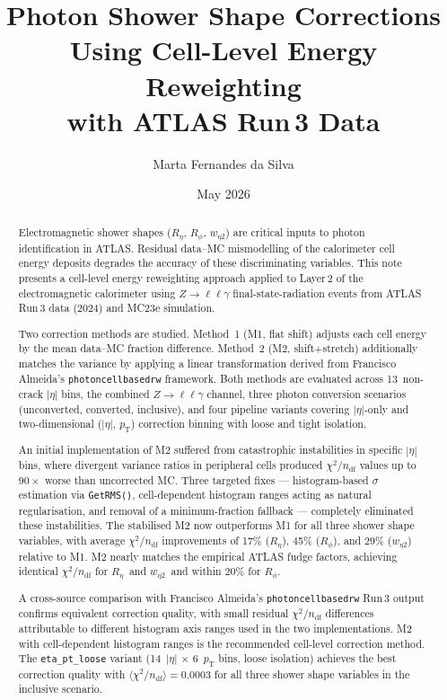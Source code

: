 \documentclass[11pt,a4paper]{article}
\title{Photon Shower Shape Corrections Using Cell-Level Energy Reweighting\\
       with ATLAS Run\,3 Data}
\author{Marta Fernandes da Silva}
\date{May 2026}
\newcommand{\Reta}{\ensuremath{R_{\eta}}}
\newcommand{\Rphi}{\ensuremath{R_{\phi}}}
\newcommand{\weta}{\ensuremath{w_{\eta 2}}}
\newcommand{\abseta}{\ensuremath{|\eta|}}
\newcommand{\chisq}{\ensuremath{\chi^2 / n_{\mathrm{df}}}}
\newcommand{\pt}{\ensuremath{p_{\mathrm{T}}}}
\begin{document}
\maketitle

\begin{abstract}
Electromagnetic shower shapes (\Reta, \Rphi, \weta) are critical inputs to
photon identification in ATLAS.  Residual data--MC mismodelling of the
calorimeter cell energy deposits degrades the accuracy of these
discriminating variables.  This note presents a cell-level energy
reweighting approach applied to Layer\,2 of the electromagnetic
calorimeter using $Z \to \ell\ell\gamma$ final-state-radiation events from
ATLAS Run\,3 data (2024) and MC23e simulation.

Two correction methods are studied.  Method~1 (M1, flat shift) adjusts
each cell energy by the mean data--MC fraction difference.  Method~2
(M2, shift+stretch) additionally matches the variance by applying a
linear transformation derived from Francisco Almeida's
\texttt{photoncellbasedrw} framework.  Both methods are evaluated across
13~non-crack $\abseta$ bins, the combined $Z \to \ell\ell\gamma$ channel,
three photon conversion scenarios (unconverted, converted, inclusive),
and four pipeline variants covering $\abseta$-only and two-dimensional
($\abseta$, $\pt$) correction binning with loose and tight isolation.

An initial implementation of M2 suffered from catastrophic instabilities
in specific $\abseta$ bins, where divergent variance ratios in peripheral
cells produced $\chisq$ values up to $90\times$ worse than uncorrected MC.
Three targeted fixes --- histogram-based $\sigma$ estimation via
\texttt{GetRMS()}, cell-dependent histogram ranges acting as natural
regularisation, and removal of a minimum-fraction fallback --- completely
eliminated these instabilities.  The stabilised M2 now outperforms M1 for
all three shower shape variables, with average $\chisq$ improvements of
17\% (\Reta), 45\% (\Rphi), and 29\% (\weta) relative to M1.  M2 nearly
matches the empirical ATLAS fudge factors, achieving identical $\chisq$ for
\Reta\ and \weta\ and within 20\% for \Rphi.

A cross-source comparison with Francisco Almeida's
\texttt{photoncellbasedrw} Run\,3 output confirms equivalent correction
quality, with small residual $\chisq$ differences attributable to
different histogram axis ranges used in the two implementations.
M2 with cell-dependent histogram ranges is the recommended cell-level
correction method.  The \texttt{eta\_pt\_loose} variant (14~$\abseta$
$\times$ 6~$\pt$ bins, loose isolation) achieves the best correction
quality with $\langle\chisq\rangle = 0.0003$ for all three shower shape
variables in the inclusive scenario.
\end{abstract}
\end{document}
